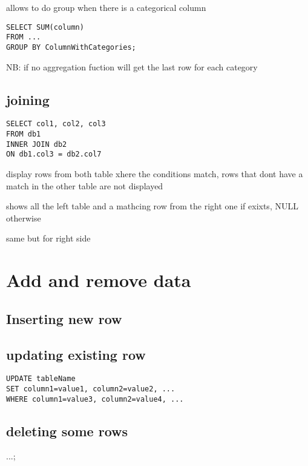 		allows to do group when there is a categorical column

\begin{lstlisting}
SELECT SUM(column)
FROM ...
GROUP BY ColumnWithCategories;
\end{lstlisting}

		NB: if no aggregation fuction will get the last row for each category


	\subsection{joining}

\begin{lstlisting}
SELECT col1, col2, col3
FROM db1
INNER JOIN db2
ON db1.col3 = db2.col7
\end{lstlisting}

		 display rows from both table xhere the conditions match, rows that dont have a match in the other table are not displayed

		 shows all the left table and a mathcing row from the right one if exixts, NULL otherwise

		 same but for right side


\section{Add and remove data}

	\subsection{Inserting new row}


	\subsection{updating existing row}

\begin{lstlisting}
UPDATE tableName
SET column1=value1, column2=value2, ...
WHERE column1=value3, column2=value4, ...
\end{lstlisting}

	\subsection{deleting some rows}

		...;

